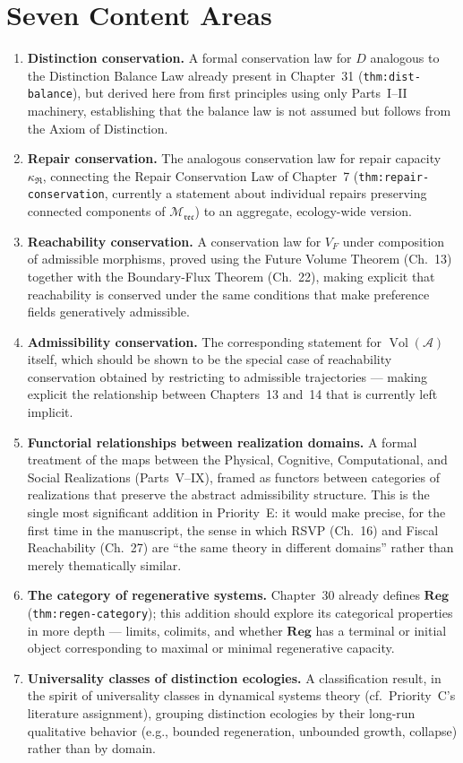 \documentclass[11pt]{report}
\newcommand{\adm}{\mathcal{A}}
\newcommand{\repair}{\mathfrak{R}}
\newcommand{\reco}{\mathfrak{rec}}
\newcommand{\Vol}{\operatorname{Vol}}
\begin{document}
\section{Seven Content Areas}

\begin{enumerate}
\item \textbf{Distinction conservation.} A formal conservation
  law for $D$ analogous to the Distinction Balance Law already
  present in Chapter~31 (\texttt{thm:dist-balance}), but derived
  here from first principles using only Parts~I--II machinery,
  establishing that the balance law is not assumed but follows
  from the Axiom of Distinction.
\item \textbf{Repair conservation.} The analogous conservation
  law for repair capacity $\kappa_\repair$, connecting the
  Repair Conservation Law of Chapter~7
  (\texttt{thm:repair-conservation}, currently a statement about
  individual repairs preserving connected components of
  $\mathcal{M}_\reco$) to an aggregate, ecology-wide version.
\item \textbf{Reachability conservation.} A conservation law
  for $V_F$ under composition of admissible morphisms, proved
  using the Future Volume Theorem (Ch.~13) together with the
  Boundary-Flux Theorem (Ch.~22), making explicit that
  reachability is conserved under the same conditions that make
  preference fields generatively admissible.
\item \textbf{Admissibility conservation.} The corresponding
  statement for $\Vol(\adm)$ itself, which should be shown to
  be the special case of reachability conservation obtained by
  restricting to admissible trajectories --- making explicit
  the relationship between Chapters~13 and~14 that is currently
  left implicit.
\item \textbf{Functorial relationships between realization
  domains.} A formal treatment of the maps between the
  Physical, Cognitive, Computational, and Social Realizations
  (Parts~V--IX), framed as functors between categories of
  realizations that preserve the abstract admissibility
  structure. This is the single most significant addition in
  Priority~E: it would make precise, for the first time in the
  manuscript, the sense in which RSVP (Ch.~16) and Fiscal
  Reachability (Ch.~27) are ``the same theory in different
  domains'' rather than merely thematically similar.
\item \textbf{The category of regenerative systems.} Chapter~30
  already defines $\mathbf{Reg}$ (\texttt{thm:regen-category});
  this addition should explore its categorical properties in
  more depth --- limits, colimits, and whether $\mathbf{Reg}$
  has a terminal or initial object corresponding to maximal or
  minimal regenerative capacity.
\item \textbf{Universality classes of distinction ecologies.}
  A classification result, in the spirit of universality
  classes in dynamical systems theory (cf.\ Priority~C's
  literature assignment), grouping distinction ecologies by
  their long-run qualitative behavior (e.g., bounded
  regeneration, unbounded growth, collapse) rather than by
  domain.
\end{enumerate}
\end{document}
